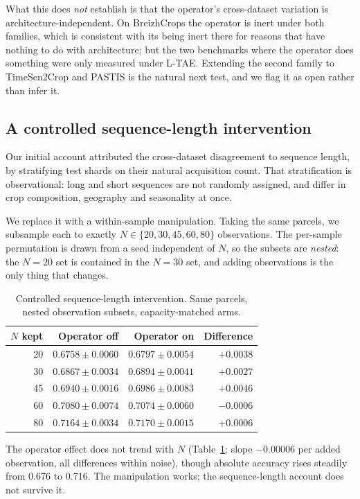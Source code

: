 \documentclass[journal]{IEEEtran}
\begin{document}
What this does \emph{not} establish is that the operator's cross-dataset
variation is architecture-independent. On BreizhCrops the operator is inert
under both families, which is consistent with its being inert there for reasons
that have nothing to do with architecture; but the two benchmarks where the
operator does something were only measured under L-TAE. Extending the second
family to TimeSen2Crop and PASTIS is the natural next test, and we flag it as
open rather than infer it.

\subsection{A controlled sequence-length intervention}
\label{sec:trl}

Our initial account attributed the cross-dataset disagreement to sequence
length, by stratifying test shards on their natural acquisition count. That
stratification is observational: long and short sequences are not randomly
assigned, and differ in crop composition, geography and seasonality at once.

We replace it with a within-sample manipulation. Taking the same parcels, we
subsample each to exactly $N \in \{20, 30, 45, 60, 80\}$ observations. The
per-sample permutation is drawn from a seed independent of $N$, so the subsets
are \emph{nested}: the $N=20$ set is contained in the $N=30$ set, and adding
observations is the only thing that changes.

\begin{table}[t]
\centering
\caption{Controlled sequence-length intervention. Same parcels, nested
observation subsets, capacity-matched arms.}
\label{tab:trl}
\footnotesize
\begin{tabular}{rrrr}
\toprule
$N$ kept & Operator off & Operator on & Difference \\
\midrule
20 & $0.6758 \pm 0.0060$ & $0.6797 \pm 0.0054$ & $+0.0038$ \\
30 & $0.6867 \pm 0.0034$ & $0.6894 \pm 0.0041$ & $+0.0027$ \\
45 & $0.6940 \pm 0.0016$ & $0.6986 \pm 0.0083$ & $+0.0046$ \\
60 & $0.7080 \pm 0.0074$ & $0.7074 \pm 0.0060$ & $-0.0006$ \\
80 & $0.7164 \pm 0.0034$ & $0.7170 \pm 0.0015$ & $+0.0006$ \\
\bottomrule
\end{tabular}
\end{table}

The operator effect does not trend with $N$ (Table~\ref{tab:trl}; slope
$-0.00006$ per added observation, all differences within noise), though absolute
accuracy rises steadily from 0.676 to 0.716. The manipulation works; the
sequence-length account does not survive it.
\end{document}
